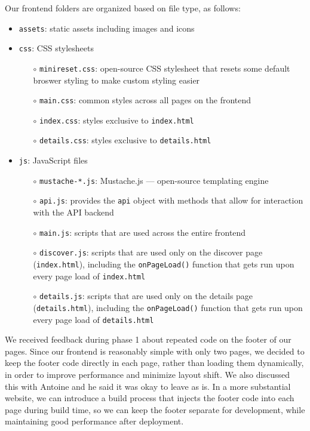\documentclass[fontsize=14pt]{article}
\def\code#1{\texttt{#1}}
\begin{document}
\medskip

\noindent
Our frontend folders are organized based on file type, as follows:
\begin{itemize}
    \item \code{assets}: static assets including images and icons
    \item \code{css}: CSS stylesheets
        \begin{itemize}
            \item[$\circ$] \code{minireset.css}: open-source CSS stylesheet that resets some default broswer styling to make custom styling easier
            \item[$\circ$] \code{main.css}: common styles across all pages on the frontend
            \item[$\circ$] \code{index.css}: styles exclusive to \code{index.html}
            \item[$\circ$] \code{details.css}: styles exclusive to \code{details.html}
        \end{itemize}
    \item \code{js}: JavaScript files
        \begin{itemize}
            \item[$\circ$] \code{mustache-*.js}: Mustache.js — open-source templating engine
            \item[$\circ$] \code{api.js}: provides the \code{api} object with methods that allow for interaction with the API backend
            \item[$\circ$] \code{main.js}: scripts that are used across the entire frontend
            \item[$\circ$] \code{discover.js}: scripts that are used only on the discover page (\code{index.html}), including the \code{onPageLoad()} function that gets run upon every page load of \code{index.html}
            \item[$\circ$] \code{details.js}: scripts that are used only on the details page (\code{details.html}), including the \code{onPageLoad()} function that gets run upon every page load of \code{details.html}
        \end{itemize}
\end{itemize}

We received feedback during phase 1 about repeated code on the footer of our pages. Since our frontend is reasonably simple with only two pages, we decided to keep the footer code directly in each page, rather than loading them dynamically, in order to improve performance and minimize layout shift. We also discussed this with Antoine and he said it was okay to leave as is. In a more substantial website, we can introduce a build process that injects the footer code into each page during build time, so we can keep the footer separate for development, while maintaining good performance after deployment. 
\end{document}
